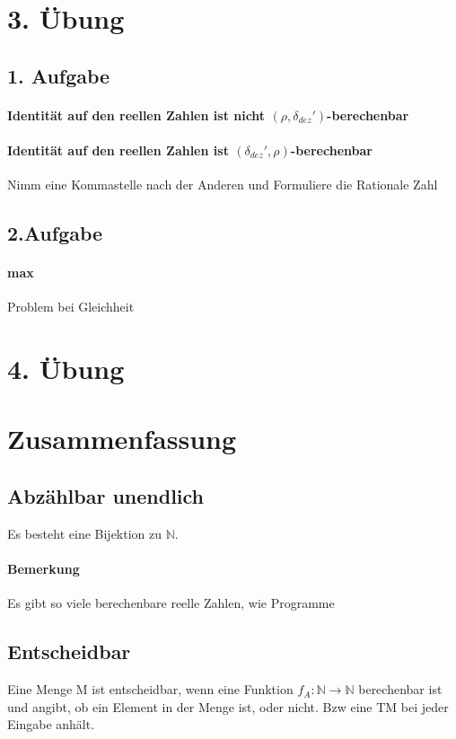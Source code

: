 \documentclass[ngerman]{scrartcl}
\begin{document}
\section{3. Übung}
\subsection*{1. Aufgabe}
\paragraph{Identität auf den reellen Zahlen ist nicht $ (\rho, \delta_{dez}') $-berechenbar} 
\paragraph{Identität auf den reellen Zahlen ist $ (\delta_{dez}', \rho) $-berechenbar} Nimm eine Kommastelle nach der Anderen und Formuliere die Rationale Zahl

\subsection*{2.Aufgabe} 
\paragraph{max} Problem bei Gleichheit


\section{4. Übung}




%
%
%
%
\newpage
\section{Zusammenfassung}

\subsection{Abzählbar unendlich} 
Es besteht eine Bijektion zu $ \mathbb{N} $. 
\paragraph{Bemerkung} Es gibt so viele berechenbare reelle Zahlen, wie Programme

\subsection{Entscheidbar} 
Eine Menge M ist entscheidbar, wenn eine Funktion $ f_A : \mathbb{N} \rightarrow \mathbb{N} $ berechenbar ist und angibt, ob ein Element in der Menge ist, oder nicht. Bzw eine TM bei jeder Eingabe anhält.
\end{document}
